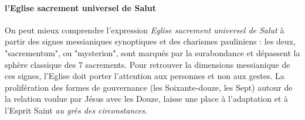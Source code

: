 \paragraph{l'Eglise sacrement universel de Salut} On peut mieux comprendre l'expression \textit{Eglise sacrement universel de Salut} à partir des signes messianiques synoptiques et des charismes pauliniens : les deux, "sacrementum", ou "mysterion", sont marqués par la surabondance et dépassent la sphère classique des 7 sacrements. Pour retrouver la dimensions messianique de ces signes, l'Eglise doit porter l'attention aux personnes et non aux gestes. La prolifération des formes de gouvernance (les Soixante-douze, les Sept) autour de la relation voulue par Jésus avec les Douze, laisse une place à l'adaptation et à l'Esprit Saint \textit{au grès des circonstances.}



 


